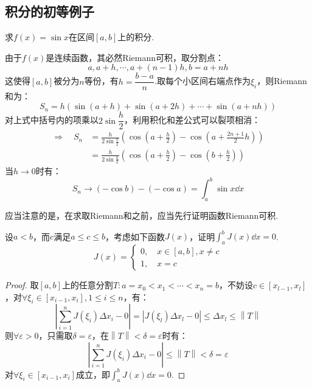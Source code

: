 \subsection{积分的初等例子}
\label{subsec:ExampleOfIntegral}
\begin{question}
    求$f(x) = \sin x$在区间$[a,b]$上的积分.
\end{question}

\begin{solution}
    由于$f(x)$是连续函数，其必然Riemann可积，取分割点：
    \[a,a+h,\cdots,a+(n-1)h,b=a+nh\]
    这使得$[a,b]$被分为$n$等份，有$h=\dfrac{b-a}{n}$.取每个小区间右端点作为$\xi_i$，则Riemann和为：
    \[S_n = h(\sin(a+h) + \sin(a+2h) + \cdots + \sin(a+nh))\]
    对上式中括号内的项乘以$2\sin\dfrac{h}{2}$，利用积化和差公式可以裂项相消：
    \begin{align*}
        \Rightarrow\quad  S_n &= \frac{h}{2\sin\frac{h}{2}}\left(\cos\left(a+\frac{h}{2}\right) - \cos\left(a+\frac{2n+1}{2}h\right)\right)\\
        &= \frac{h}{2\sin\frac{h}{2}}\left(\cos\left(a+\frac{h}{2}\right) - \cos\left(b+\frac{h}{2}\right)\right)
    \end{align*}
    当$h \to 0$时有：
    \[S_n \to (-\cos b) - (-\cos a) = \int_{a}^{b}\sin x\dd{x}\]
\end{solution}

应当注意的是，在求取Riemann和之前，应当先行证明函数Riemann可积.

\begin{question}
    \label{ques:DefinitionOfJ(x)}
    设$a<b$，而$c$满足$a \leqslant c \leqslant b$，考虑如下函数$J(x)$，证明$\displaystyle\int_{a}^{b}J(x)\dd{x} = 0$.
    \[J(x) = \begin{cases}
        0,\quad x \in [a,b],x\neq c\\
        1,\quad x = c
    \end{cases}\]
\end{question}

\begin{proof}
    取$[a,b]$上的任意分割$T:a=x_0<x_1<\cdots<x_n=b$，不妨设$c \in [x_{l-1},x_l]$，对$\forall \xi_i \in [x_{i-1},x_i],1\leqslant i \leqslant n$，有：
    \[\left|\sum_{i=1}^{n}J(\xi_i)\Delta x_i - 0\right| = |J(\xi_l)\Delta x_l - 0| \leqslant \Delta x_l \leqslant \left\|T\right\|\]
    则$\forall \varepsilon > 0$，只需取$\delta = \varepsilon$，在$\left\|T\right\| < \delta = \varepsilon$时有：
    \[\left|\sum_{i=1}^{n}J(\xi_i)\Delta x_i - 0\right| \leqslant \left\|T\right\| < \delta = \varepsilon\]
    对$\forall \xi_i \in [x_{i-1},x_i]$成立，即$\displaystyle\int_{a}^{b}J(x)\dd{x} = 0$.
\end{proof}

